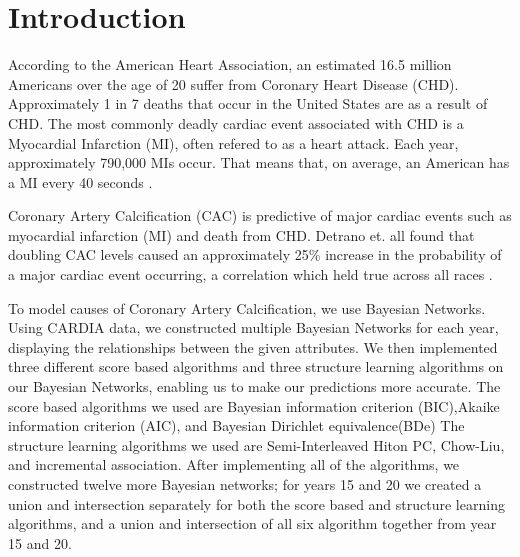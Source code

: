 \section{Introduction}

According to the American Heart Association, an estimated 16.5 million Americans over the age of 20 suffer from Coronary Heart Disease (CHD). Approximately 1 in 7 deaths that occur in the United States are as a result of CHD. The most commonly deadly cardiac event associated with CHD is a Myocardial Infarction (MI), often refered to as a heart attack. Each year, approximately 790,000 MIs occur. That means that, on average, an American has a MI every 40 seconds \cite{Benjamin2017}.

Coronary Artery Calcification (CAC) is predictive of major cardiac events such as myocardial infarction (MI) and death from CHD. Detrano et. all found that doubling CAC levels caused an approximately 25\% increase in the probability of a major cardiac event occurring, a correlation which held true across all races \cite{Detrano2008}. 




To model causes of Coronary Artery Calcification, we use Bayesian Networks.  Using CARDIA data, we constructed multiple Bayesian Networks for each year, displaying the relationships between the given attributes.  We then implemented three different score based algorithms and three structure learning algorithms on our Bayesian Networks, enabling us to make our predictions more accurate.  The score based algorithms we used are Bayesian information criterion (BIC),Akaike information criterion (AIC), and Bayesian Dirichlet equivalence(BDe)  The structure learning algorithms we used are Semi-Interleaved Hiton PC, Chow-Liu, and incremental association.  After implementing all of the algorithms, we constructed twelve more Bayesian networks; for years 15 and 20 we created a union and intersection separately for both the score based and structure learning algorithms, and a union and intersection of all six algorithm together from year 15 and 20.



